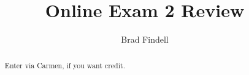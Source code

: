 \documentclass[handout,space,nooutcomes]{xourse}
\title{Online Exam 2 Review}
\author{Brad Findell}
\begin{document}
\begin{abstract}
Enter via Carmen, if you want credit.  
\end{abstract}
\maketitle

\end{document}
